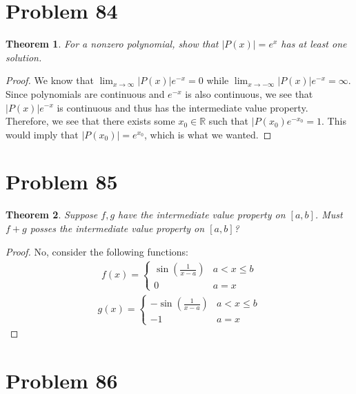 \documentclass[psamsfonts]{amsart}
\newtheorem{thm}{Theorem}[section]
\theoremstyle{definition}
\theoremstyle{remark}
\numberwithin{equation}{section}
\begin{document}
\section{Problem 84}

\begin{thm}
For a nonzero polynomial, show that $|P(x)| = e^x$ has at least one solution.
\end{thm}

\begin{proof}
We know that $\lim_{x \to \infty} |P(x)| e^{-x} = 0$ while $\lim_{x \to -\infty} |P(x)| e^{-x} = \infty$. Since polynomials are continuous and $e^{-x}$ is also continuous, we see that $|P(x)| e^{-x}$ is continuous and thus has the intermediate value property. Therefore, we see that there exists some $x_0 \in \mathbb{R}$ such that $|P(x_0) e^{-x_0} = 1$. This would imply that $|P(x_0)| = e^{x_0}$, which is what we wanted.
\end{proof}

\section{Problem 85}

\begin{thm}
Suppose $f,g$ have the intermediate value property on $[a,b]$. Must $f + g$ posses the intermediate value property on $[a,b]$?
\end{thm}

\begin{proof}
No, consider the following functions:
\begin{eqnarray}
f(x) = \left\{ \begin{array}{ll}
\sin \left( \frac{1}{x-a} \right) & a < x \leq b \\
0 & a = x \end{array} \right.
\end{eqnarray}
\begin{eqnarray}
g(x) = \left\{ \begin{array}{ll}
- \sin \left( \frac{1}{x-a} \right) & a < x \leq b \\
-1 & a = x \end{array} \right.
\end{eqnarray}
\end{proof}

\section{Problem 86}
\end{document}
